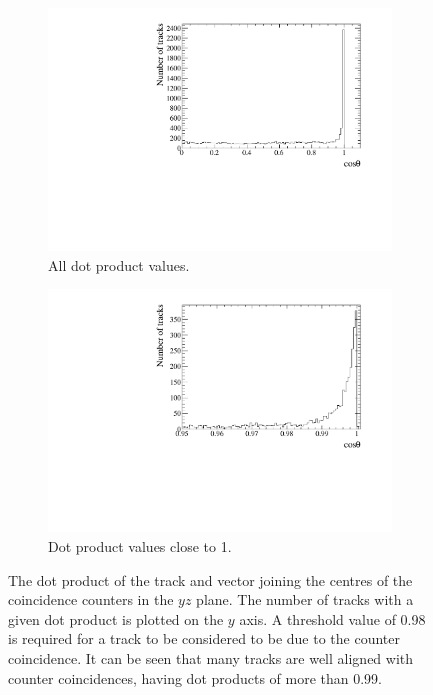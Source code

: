 \begin{figure}
  \centering
  \begin{subfigure}{0.48\textwidth}
    \centering
    \includegraphics[width=\textwidth]{CosTheta_Data}
    \caption{All dot product values.}
  \end{subfigure}%
  \hspace{0.03\textwidth}%
  \begin{subfigure}{0.48\textwidth}
    \centering
    \includegraphics[width=\textwidth]{CosThetaZoom_Data}
    \caption{Dot product values close to 1.}
  \end{subfigure}
  \caption[The dot product of the track and vector joining the centres of the coincidence counters in the $yz$ plane]
          {The dot product of the track and vector joining the centres of the coincidence counters in the $yz$ plane. The number of tracks with a given dot product is plotted on the $y$ axis. A threshold value of 0.98 is required for a track to be considered to be due to the counter coincidence. It can be seen that many tracks are well aligned with counter coincidences, having dot products of more than 0.99.}
          \label{fig:CounterCoincidence}
\end{figure}

